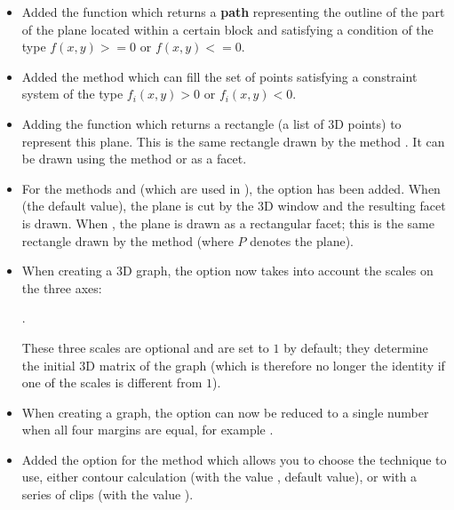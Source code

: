 \begin{itemize}
    \item Added the function  which returns a \textbf{path} representing the outline of the part of the plane located within a certain block and satisfying a condition of the type $f(x,y)>=0$ or $f(x,y)<=0$.
    
    \item Added the method  which can fill the set of points satisfying a constraint system of the type $f_i(x,y)>0$ or $f_i(x,y)<0$.
    
    \item Adding the function  which returns a rectangle (a list of 3D points) to represent this plane. This is the same rectangle drawn by the method . It can be drawn using the method  or as a facet.
    
    \item For the methods  and  (which are used in ), the  option has been added. When  (the default value), the plane is cut by the 3D window and the resulting facet is drawn. When , the plane is drawn as a rectangular facet; this is the same rectangle drawn by the method  (where $P$ denotes the plane).
    
    \item When creating a 3D graph, the  option now takes into account the scales on the three axes:\par
    \hfil{}.\hfil\par
    These three scales are optional and are set to $1$ by default; they determine the initial 3D matrix of the graph (which is therefore no longer the identity if one of the scales is different from $1$).
    
    \item When creating a graph, the  option can now be reduced to a single number when all four margins are equal, for example .
    
    \item Added the option  for the method  which allows you to choose the technique to use, either contour calculation (with the value \false, default value), or with a series of clips (with the value \true).


\end{itemize}
